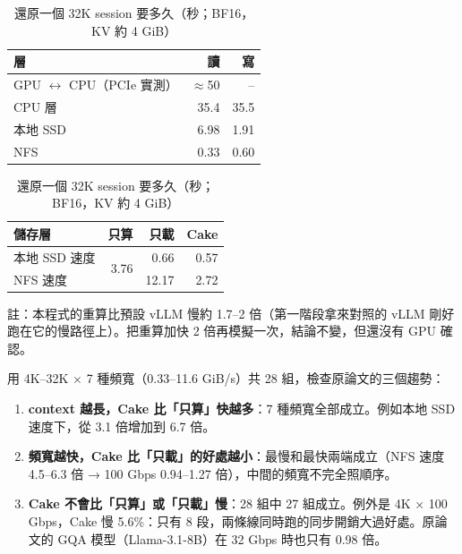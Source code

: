 \documentclass[11pt,a4paper]{article}
\newcommand{\note}[1]{{\footnotesize\color{black!70}#1}}
\newcommand{\sect}[1]{\vspace{8pt}{\large\bfseries #1}\par\vspace{2pt}}
\newcommand{\subsect}[1]{\vspace{4pt}{\bfseries #1}\par}
\begin{document}
\begin{table}[h]
\centering
\begin{minipage}[t]{0.44\linewidth}
\centering
\caption{各層頻寬（GiB/s）}\label{tab:tier}
\begin{tabular}{lrr}
\toprule
層 & 讀 & 寫 \\
\midrule
GPU $\leftrightarrow$ CPU（PCIe 實測） & $\approx$50 & -- \\
CPU 層 & 35.4 & 35.5 \\
本地 SSD & 6.98 & 1.91 \\
NFS & 0.33 & 0.60 \\
\bottomrule
\end{tabular}
\end{minipage}\hfill
\begin{minipage}[t]{0.52\linewidth}
\centering
\caption{還原一個 32K session 要多久（秒；BF16，KV 約 4 GiB）}\label{tab:restore}
\begin{tabular}{lrrr}
\toprule
儲存層 & 只算 & 只載 & Cake \\
\midrule
本地 SSD 速度 & \multirow{2}{*}{3.76} & 0.66 & 0.57 \\
NFS 速度 & & 12.17 & 2.72 \\
\bottomrule
\end{tabular}

\vspace{2pt}
\note{註：本程式的重算比預設 vLLM 慢約 1.7--2 倍（第一階段拿來對照的 vLLM 剛好跑在它的慢路徑上）。把重算加快 2 倍再模擬一次，結論不變，但還沒有 GPU 確認。}
\end{minipage}
\end{table}

\subsect{Cake（最接近的 baseline）有跑通}
用 4K--32K × 7 種頻寬（0.33--11.6 GiB/s）共 28 組，檢查原論文的三個趨勢：
\begin{enumerate}
\item \textbf{context 越長，Cake 比「只算」快越多}：7 種頻寬全部成立。例如本地 SSD 速度下，從 3.1 倍增加到 6.7 倍。
\item \textbf{頻寬越快，Cake 比「只載」的好處越小}：最慢和最快兩端成立（NFS 速度 4.5--6.3 倍 → 100 Gbps 0.94--1.27 倍），中間的頻寬不完全照順序。
\item \textbf{Cake 不會比「只算」或「只載」慢}：28 組中 27 組成立。例外是 4K × 100 Gbps，Cake 慢 5.6\%：只有 8 段，兩條線同時跑的同步開銷大過好處。原論文的 GQA 模型（Llama-3.1-8B）在 32 Gbps 時也只有 0.98 倍。
\end{enumerate}

\sect{二、實驗內容}
\end{document}
